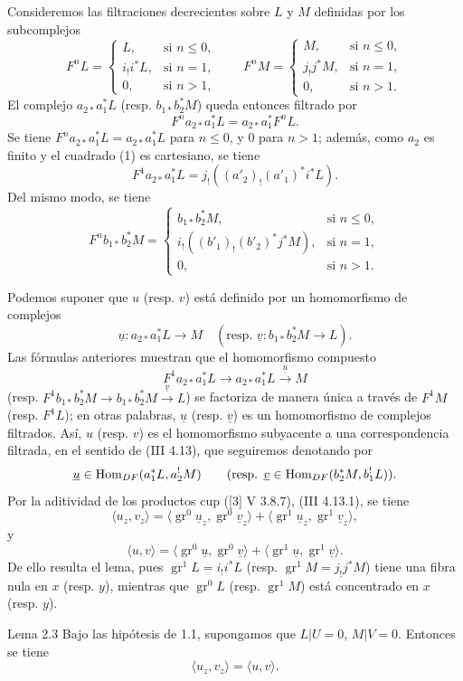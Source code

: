 Consideremos las filtraciones decrecientes sobre $L$ y $M$ definidas por los subcomplejos
\[
F^nL=
\begin{cases}
L,& \text{si } n\le 0,\\
i_!i^*L,& \text{si } n=1,\\
0,& \text{si } n>1,
\end{cases}
\qquad
F^nM=
\begin{cases}
M,& \text{si } n\le 0,\\
j_!j^*M,& \text{si } n=1,\\
0,& \text{si } n>1.
\end{cases}
\]
El complejo $a_{2*}a_1^*L$ (resp. $b_{1*}b_2^*M$) queda entonces filtrado por
\[
F^n a_{2*}a_1^*L=a_{2*}a_1^*F^nL.
\]
Se tiene $F^n a_{2*}a_1^*L=a_{2*}a_1^*L$ para $n\le 0$, y $0$ para $n>1$; además, como $a_2$ es finito y el cuadrado (1) es cartesiano, se tiene
\[
F^1a_{2*}a_1^*L=j_!((a'_2)_!(a'_1)^*i^*L).
\]
Del mismo modo, se tiene
\[
F^n b_{1*}b_2^*M=
\begin{cases}
b_{1*}b_2^*M,& \text{si } n\le 0,\\
i_!((b'_1)_!(b'_2)^*j^*M),& \text{si } n=1,\\
0,& \text{si } n>1.
\end{cases}
\]

Podemos suponer que $u$ (resp. $v$) está definido por un homomorfismo de complejos
\[
\underline{u}:a_{2*}a_1^*L\longrightarrow M
\quad
(\text{resp. }\underline{v}:b_{1*}b_2^*M\longrightarrow L).
\]
Las fórmulas anteriores muestran que el homomorfismo compuesto
\[
F^1a_{2*}a_1^*L\longrightarrow a_{2*}a_1^*L\xrightarrow{\underline{u}}M
\]
(resp. $F^1b_{1*}b_2^*M\to b_{1*}b_2^*M\xrightarrow{\underline{v}}L$) se factoriza de manera única a través de $F^1M$ (resp. $F^1L$); en otras palabras, $\underline{u}$ (resp. $\underline{v}$) es un homomorfismo de complejos filtrados. Así, $u$ (resp. $v$) es el homomorfismo subyacente a una correspondencia filtrada, en el sentido de (III 4.13), que seguiremos denotando por
\[
\underline{u}\in\operatorname{Hom}_{DF}(a_1^*L,a_2^!M)\qquad
(\text{resp. }\underline{v}\in\operatorname{Hom}_{DF}(b_2^*M,b_1^!L)).
\]
Por la aditividad de los productos cup ([3] V 3.8.7), (III 4.13.1), se tiene
\[
\langle u_z,v_z\rangle
 =\langle \operatorname{gr}^0\underline{u}_z,\operatorname{gr}^0\underline{v}_z\rangle
 +\langle \operatorname{gr}^1\underline{u}_z,\operatorname{gr}^1\underline{v}_z\rangle,
\]
y
\[
\langle u,v\rangle
 =\langle \operatorname{gr}^0\underline{u},\operatorname{gr}^0\underline{v}\rangle
 +\langle \operatorname{gr}^1\underline{u},\operatorname{gr}^1\underline{v}\rangle.
\]
De ello resulta el lema, pues $\operatorname{gr}^1L=i_!i^*L$ (resp. $\operatorname{gr}^1M=j_!j^*M$) tiene una fibra nula en $x$ (resp. $y$), mientras que $\operatorname{gr}^0L$ (resp. $\operatorname{gr}^1M$) está concentrado en $x$ (resp. $y$).

\begin{statement}{Lema 2.3}
Bajo las hipótesis de 1.1, supongamos que $L|U=0$, $M|V=0$. Entonces se tiene
\[
\langle u_z,v_z\rangle=\langle u,v\rangle .
\]
\end{statement}
